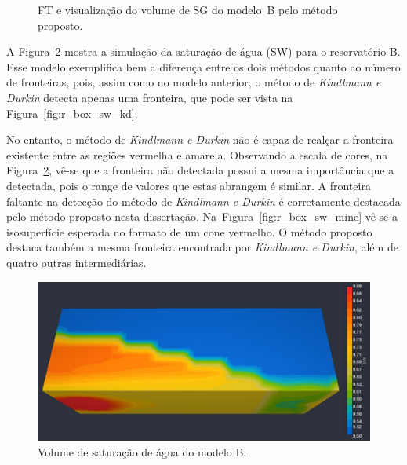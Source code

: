 \begin{figure}[h]
	\centering
	\caption{FT e visualização do volume de SG do modelo~B pelo método proposto.}
	\label{fig:r_box_sg_mine}
\end{figure}

\clearpage
	A Figura~\ref{fig:r_box_sw_slice} mostra a simulação da saturação de água (SW) para o reservatório B. Esse modelo exemplifica bem a diferença entre os dois métodos quanto ao número de fronteiras, pois, assim como no modelo anterior, o método de \textit{Kindlmann e Durkin} detecta apenas uma fronteira, que pode ser vista na Figura~\ref{fig:r_box_sw_kd}.
	
	No entanto, o método de \textit{Kindlmann e Durkin} não é capaz de realçar a fronteira existente entre as regiões vermelha e amarela. Observando a escala de cores, na Figura~\ref{fig:r_box_sw_slice}, vê-se que a fronteira não detectada possui a mesma importância que a detectada, pois o range de valores que estas abrangem é similar. A fronteira faltante na detecção do método de \textit{Kindlmann e Durkin} é corretamente destacada pelo método proposto nesta dissertação. Na~Figura~\ref{fig:r_box_sw_mine} vê-se a isosuperfície esperada no formato de um cone vermelho. O método proposto destaca também a mesma fronteira encontrada por \textit{Kindlmann e Durkin}, além de quatro outras intermediárias.
	
\begin{figure}[h]
	\centering
	\includegraphics[width=1\textwidth]{images/r_box_sw_slice}
	\caption{Volume de saturação de água do modelo B.}
	\label{fig:r_box_sw_slice}
\end{figure}

